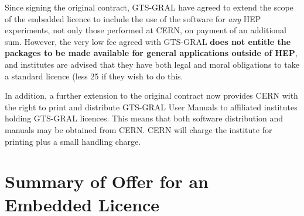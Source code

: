 Since signing the original contract, GTS-GRAL have agreed to
extend the scope of the embedded licence to include the use of the
software for {\it any} HEP experiments, not only those performed
at CERN, on payment of an additional sum.
However, the very low fee agreed with GTS-GRAL {\bf does not entitle
the packages to be made available for general applications outside of
HEP}, and institutes are advised that they have both legal and moral
obligations to take a standard licence (less 25%
if they wish to do this.
 
In addition, a further extension to the original contract now provides CERN
with the right to print and distribute GTS-GRAL User Manuals to affiliated
institutes holding GTS-GRAL licences. This means that both
software distribution and manuals may be obtained from CERN.
CERN will charge the institute for printing plus a small
handling charge.
\section{Summary of Offer for an Embedded Licence}
 
